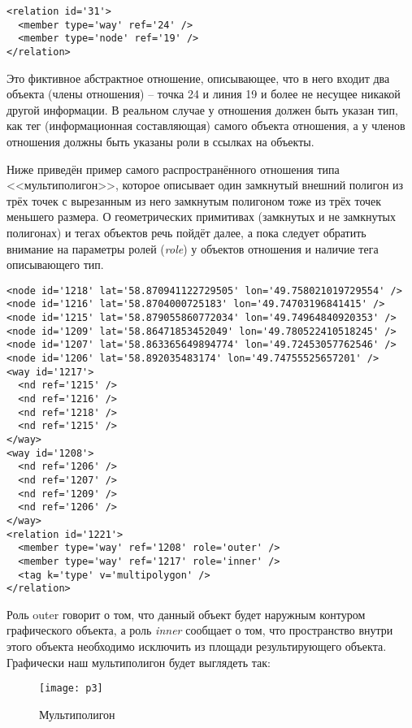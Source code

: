 \begin{verbatim}
<relation id='31'>
  <member type='way' ref='24' />
  <member type='node' ref='19' />
</relation>
\end{verbatim}

Это фиктивное абстрактное отношение, описывающее, что в него входит два 
объекта (члены отношения) -- точка 24 и линия 19 и более не несущее никакой 
другой информации. В реальном случае у отношения должен быть указан тип, как 
тег (информационная составляющая) самого объекта отношения, а у членов 
отношения должны быть указаны роли в ссылках на объекты.

Ниже приведён пример самого распространённого отношения типа <<мультиполигон>>, 
которое описывает один замкнутый внешний полигон из трёх точек с вырезанным из 
него замкнутым полигоном тоже из трёх точек меньшего размера. О геометрических 
примитивах (замкнутых и не замкнутых полигонах) и тегах объектов речь пойдёт 
далее, а пока следует обратить внимание на параметры ролей (\emph{role}) у 
объектов отношения и наличие тега описывающего тип. 

\begin{verbatim}
<node id='1218' lat='58.870941122729505' lon='49.758021019729554' />
<node id='1216' lat='58.8704000725183' lon='49.74703196841415' />
<node id='1215' lat='58.879055860772034' lon='49.74964840920353' />
<node id='1209' lat='58.86471853452049' lon='49.780522410518245' />
<node id='1207' lat='58.863365649894774' lon='49.72453057762546' />
<node id='1206' lat='58.892035483174' lon='49.74755525657201' />
<way id='1217'>
  <nd ref='1215' />
  <nd ref='1216' />
  <nd ref='1218' />
  <nd ref='1215' />
</way>
<way id='1208'>
  <nd ref='1206' />
  <nd ref='1207' />
  <nd ref='1209' />
  <nd ref='1206' />
</way>
<relation id='1221'>
  <member type='way' ref='1208' role='outer' />
  <member type='way' ref='1217' role='inner' />
  <tag k='type' v='multipolygon' />
</relation>
\end{verbatim}

Роль outer говорит о том, что данный объект будет наружным контуром 
графического объекта, а роль \emph{inner} сообщает о том, что пространство 
внутри этого объекта необходимо исключить из площади результирующего объекта. 
Графически наш мультиполигон будет выглядеть так:

\begin{figure}[ht!]
    \texttt{[image: p3]}
    \caption{Мультиполигон}
    \label{multipoly01}
\end{figure}

